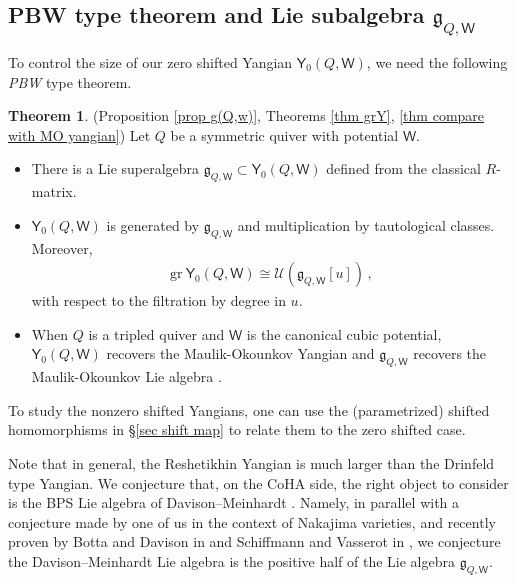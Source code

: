 \documentclass[10pt]{amsart}
\theoremstyle{definition}
\newtheorem{Theorem}{Theorem}[section]
\numberwithin{equation}{section}
\newcommand{\sW}{\mathsf{W}}
\begin{document}
\subsection{PBW type theorem and Lie subalgebra $\mathfrak{g}_{Q,\sW}$}

To control the size of our zero shifted Yangian $\mathsf Y_0(Q,\sW)$, we need the following \textit{PBW} type theorem. 
\begin{Theorem}(Proposition \ref{prop g(Q,w)}, Theorems \ref{thm grY}, \ref{thm compare with MO yangian})
Let $Q$ be a symmetric quiver with potential $\sW$.  
\begin{itemize}
    \item There is a Lie superalgebra $\mathfrak{g}_{Q,\sW} \subset \mathsf Y_0(Q,\sW)$ defined from the classical $R$-matrix. 
    \item $\mathsf Y_0(Q,\sW)$ is generated by $\mathfrak{g}_{Q,\sW}$ and multiplication by tautological classes.
Moreover, 
\begin{align*}
    \mathrm{gr}\: \mathsf Y_0(Q,\sW)\cong \mathcal U(\mathfrak{g}_{Q,\sW}[u])\,,
\end{align*}
with respect to the filtration by degree in $u$.
\item When $Q$ is a tripled quiver and $\sW$ is the canonical cubic potential, $\mathsf Y_0(Q,\sW)$ recovers the Maulik-Okounkov Yangian 
and $\mathfrak{g}_{Q,\sW}$ recovers the Maulik-Okounkov Lie algebra \cite{MO}. 
\end{itemize}
\end{Theorem}
To study the nonzero shifted Yangians, one can use the (parametrized) shifted homomorphisms in \S \ref{sec shift map} 
to relate them to the zero shifted case.

Note that in general, the Reshetikhin Yangian is much larger than the Drinfeld type Yangian.  
We conjecture
that, on the CoHA side, the right object to consider is
the BPS Lie algebra of Davison--Meinhardt \cite{DM}. Namely, in
parallel with a conjecture made by one of us in the context of
Nakajima varieties, and recently proven by Botta and Davison in
\cite{BD} and Schiffmann and Vasserot in \cite{SV2}, we conjecture the Davison--Meinhardt  Lie algebra is
the positive half of the Lie algebra $\mathfrak{g}_{Q,\sW}$. 
\end{document}

